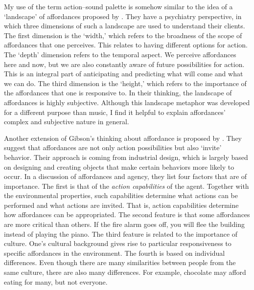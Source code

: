 My use of the term action--sound palette is somehow similar to the idea of a `landscape' of affordances proposed by \citet{de_haan_phenomenology_2013}. They have a psychiatry perspective, in which three dimensions of such a landscape are used to understand their clients. The first dimension is the `width,' which refers to the broadness of the scope of affordances that one perceives. This relates to having different options for action. The `depth' dimension refers to the temporal aspect. We perceive affordances here and now, but we are also constantly aware of future possibilities for action. This is an integral part of anticipating and predicting what will come and what we can do. The third dimension is the `height,' which refers to the importance of the affordances that one is responsive to. In their thinking, the landscape of affordances is highly subjective. Although this landscape metaphor was developed for a different purpose than music, I find it helpful to explain affordances' complex and subjective nature in general.

Another extension of Gibson's thinking about affordance is proposed by \citet{withagen_affordances_2012}. They suggest that affordances are not only action possibilities but also `invite' behavior. Their approach is coming from industrial design, which is largely based on designing and creating objects that make certain behaviors more likely to occur. In a discussion of affordances and agency, they list four factors that are of importance. The first is that of the \emph{action capabilities} of the agent. Together with the environmental properties, such capabilities determine what actions can be performed and what actions are invited. That is, action capabilities determine how affordances can be appropriated. The second feature is that some affordances are more critical than others. If the fire alarm goes off, you will flee the building instead of playing the piano. The third feature is related to the importance of culture. One's cultural background gives rise to particular responsiveness to specific affordances in the environment. The fourth is based on individual differences. Even though there are many similarities between people from the same culture, there are also many differences. For example, chocolate may afford eating for many, but not everyone.

